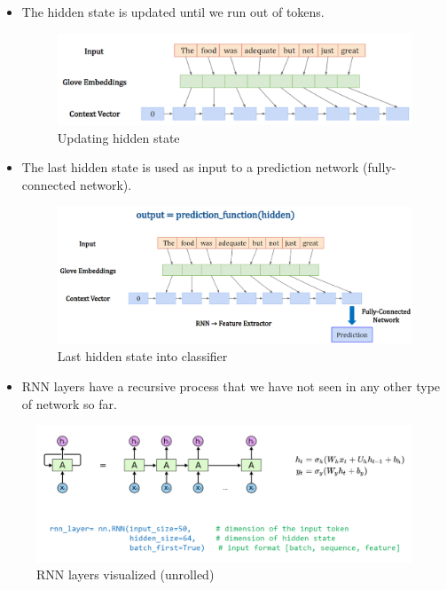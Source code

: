 \begin{itemize}
    \item The hidden state is updated until we run out of tokens.

\begin{figure}[h!t]
    \centering
    \includegraphics[width=0.75\linewidth]{updatinghiddenstate1.png}
    \caption{Updating hidden state}
    \label{fig:enter-label}
\end{figure}

    \item The last hidden state is used as input to a prediction network (fully-connected network).

\begin{figure}[h!t]
    \centering
    \includegraphics[width=0.75\linewidth]{updatehiddenstate2.png}
    \caption{Last hidden state into classifier}
    \label{fig:enter-label}
\end{figure}

    \item RNN layers have a recursive process that we have not seen in any other type of network so far.
\end{itemize}

\begin{figure}[h!t]
    \centering
    \includegraphics[width=1\linewidth]{rennrecursion.png}
    \caption{RNN layers visualized (unrolled)}
    \label{fig:enter-label}
\end{figure}


